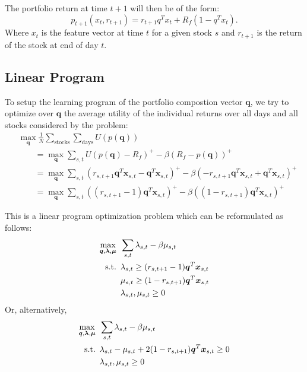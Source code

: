 \documentclass[11pt,fleqn]{article}
\begin{document}
The portfolio return at time $t+1$  will then be of the form:
\begin{equation*}
  p_{t+1}(x_t,r_{t+1}) = r_{t+1}q^Tx_t + R_f(1-q^Tx_t).
\end{equation*}
Where $x_t$ is the feature vector at time $t$ for a given stock $s$ and $r_{t+1}$ is the
return of the stock at end of day $t$.

\subsection{Linear Program}


To setup the learning program of the portfolio compostion vector $\bm q$, we try to
optimize over $\bm q$ the average utility of the individual returns over all days and all
stocks considered by the problem:
\begin{align*}
  &\max_{\bm q} \frac{1}{N} \sum_{\text{stocks}}\sum_{\text{days}} U(p(\bm q))\\
  &\qquad=\max_{\bm q} \sum_{s,t} U(p(\bm q)-R_f)^+ - \beta (R_f - p(\bm q))^+\\
  &\qquad = \max_{\bm q} \sum_{s,t} (r_{s,t+1} \bm q^T \bm x_{s,t} - \bm q^T \bm
    x_{s,t})^+ -\beta(-r_{s,t+1}\bm q^T \bm x_{s,t}+\bm q^T\bm x_{s,t})^+\\
  &\qquad = \max_{\bm q} \sum_{s,t} ((r_{s,t+1}-1)\bm q^T\bm x_{s,t})^+
    -\beta((1-r_{s,t+1})\bm q^T\bm x_{s,t})^+
\end{align*}

This is a linear program optimization problem which can be reformulated as follows:
\begin{align*}
  \max_{\bm q,\bm\lambda,\bm\mu} &\hspace{0.5em} \sum_{s,t} \lambda_{s,t} - \beta\mu_{s,t}\\
  \mathrm{s.t.} &\hspace{0.5em} \lambda_{s,t} \geq (r_{s,t+1}-1)\bm q^T\bm x_{s,t}\\
  &\hspace{0.5em} \mu_{s,t} \geq (1-r_{s,t+1})\bm q^T\bm x_{s,t}\\
  &\hspace{0.5em} \lambda_{s,t}, \mu_{s,t} \geq 0
\end{align*}
Or, alternatively,
\begin{align*}
  \max_{\bm q,\bm \lambda,\bm \mu}  &\hspace{0.5em} \sum_{s,t} \lambda_{s,t} - \beta \mu_{s,t}\\
  \mathrm{s.t.} &\hspace{0.5em} \lambda_{s,t} - \mu_{s,t} + 2(1-r_{s,t+1})\bm q^T\bm x_{s,t} \geq 0\\
  &\hspace{0.5em} \lambda_{s,t}, \mu_{s,t} \geq 0
\end{align*}
\end{document}
